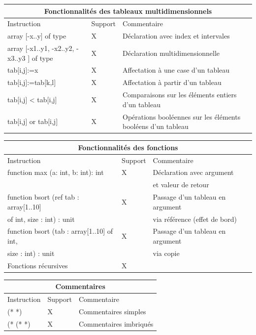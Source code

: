 \documentclass[a4paper]{article}
\begin{document}
\begin{center}
\begin{tabular}{|l|l|l|}
  \hline
  \multicolumn{3}{|c|}{Fonctionnalités des tableaux multidimensionnels} \\
  \hline
  Instruction & Support & Commentaire \\
  \hline
  array $[$-x..y$]$ of type & X & Déclaration avec index et intervales \\
  array $[$-x1..y1, -x2..y2, -x3..y3 $]$ of type & X & Déclaration multidimensionnelle \\
  tab$[$i,j$]$:=x & X & Affectation à une case d'un tableau \\
  tab$[$i,j$]$:=tab$[$k,l$]$ & X & Affectation à partir d'un tableau \\
  tab$[$i,j$]$ < tab$[$i,j$]$ & X & Comparaisons sur les éléments entiers d'un tableau \\
  tab$[$i,j$]$ or tab$[$i,j$]$ & X & Opérations booléennes sur les éléments booléens d'un tableau \\
  \hline
\end{tabular}

\begin{tabular}{|l|l|l|}
  \hline
  \multicolumn{3}{|c|}{Fonctionnalités des fonctions} \\
  \hline
  Instruction & Support & Commentaire \\
  \hline
  function max (a: int, b: int): int  & X & Déclaration avec argument\\
  & & et valeur de retour \\
  function bsort (ref tab : array[1..10] & X & Passage d'un tableau en argument \\
  of int, size : int) : unit  & & via référence (effet de bord)\\
  function bsort (tab : array[1..10] of int, & X & Passage d'un tableau en argument \\
   size : int) : unit  & & via copie \\
  Fonctions récursives & X & \\
  \hline
\end{tabular}

\begin{tabular}{|l|l|l|}
  \hline
  \multicolumn{3}{|c|}{Commentaires} \\
  \hline
  Instruction & Support & Commentaire \\
  \hline
  (* *) & X & Commentaires simples \\
  (* (* *) & X & Commentaires imbriqués \\
  \hline
\end{tabular}


\end{center}
\end{document}
